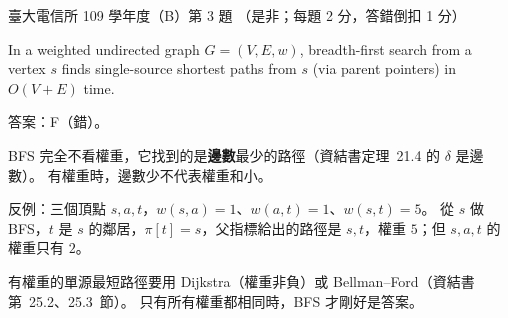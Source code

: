 \begin{pastexam}[label={px:ntu-109-comm-dsa-03}]{臺大電信所 109 學年度（B）第 3 題}
（是非；每題 2 分，答錯倒扣 1 分）

In a weighted undirected graph $G=(V,E,w)$, breadth-first search from a vertex $s$ finds
single-source shortest paths from $s$ (via parent pointers) in $O(V+E)$ time.
\end{pastexam}

\begin{pastsoln}
答案：F（錯）。

BFS 完全不看權重，它找到的是\textbf{邊數}最少的路徑（資結書定理~21.4 的 $\delta$ 是邊數）。
有權重時，邊數少不代表權重和小。

反例：三個頂點 $s, a, t$，$w(s, a) = 1$、$w(a, t) = 1$、$w(s, t) = 5$。 從 $s$ 做 BFS，$t$
是 $s$ 的鄰居，$\pi[t] = s$，父指標給出的路徑是 $s, t$，權重 $5$；但 $s, a, t$ 的權重只有
$2$。

有權重的單源最短路徑要用 Dijkstra（權重非負）或 Bellman--Ford（資結書第~25.2、25.3~節）。
只有所有權重都相同時，BFS 才剛好是答案。
\end{pastsoln}
